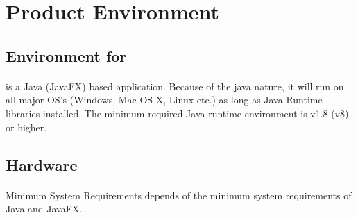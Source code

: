 \section{Product Environment}
\subsection{Environment for \app{}}
\paragraph{}\app{} is a Java (JavaFX) based application. Because of the java nature, it will run on all major OS's (Windows, Mac OS X, Linux etc.) as long as Java Runtime libraries installed. The minimum required Java runtime environment is v1.8 (v8) or higher.

\subsection{Hardware}
\paragraph{}Minimum System Requirements depends of the minimum system requirements of Java and JavaFX.
